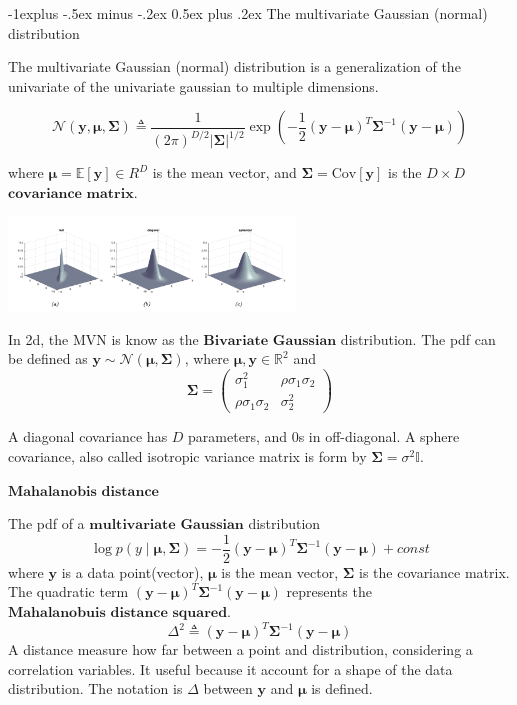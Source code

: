 \documentclass[10pt,landscape]{article}
\makeatletter
\newcommand{\cov}{\textrm{Cov}}
\newcommand{\N}{\mathcal{N}}
\newcommand{\mean}{\mathbb{E}}
\newcommand{\indicator}{\mathbb{I}}
\newcommand{\out}{\textbf{y}}
\newcommand{\R}{\mathbb{R}}
\newcommand{\variance}{\sigma^2}
\newcommand{\Cov}{\mathbf{\Sigma}}
\newcommand{\Mean}{\boldsymbol{\mu}}
\renewcommand{\subsection}{\@startsection{subsection}{2}{0mm}%
                                {-1explus -.5ex minus -.2ex}%
                                {0.5ex plus .2ex}%
                                {\normalfont\normalsize\bfseries}}
\makeatother
\begin{document}
\begin{multicols*}{3}
\subsection{The multivariate Gaussian (normal) distribution}

The multivariate Gaussian (normal) distribution is a generalization of the univariate of the univariate gaussian to multiple dimensions.

\[
    \N(\out,\Mean,\Cov) \triangleq \frac{1}{(2\pi)^{D/2}|\Cov|^{1/2}}\exp\left(-\frac{1}{2}(\out-\Mean)^T\Cov^{-1}(\out-\Mean)\right)
\]

where $\Mean = \mean[\out] \in R^D$ is the mean vector, and $\Cov=\cov[\out]$ is the $D\times D$ $\textbf{covariance matrix}$.

\begin{minipage}{\linewidth}
    \centering
    \includegraphics[width=3in]{figures/MVN.PNG}
\end{minipage}
In 2d, the MVN is know as the $\textbf{Bivariate Gaussian}$ distribution. The pdf can be defined as $\out\sim\N(\Mean,\Cov)$, where $\Mean,\out\in\R^2$ and 
\[
    \Cov=
    \begin{pmatrix}
        \sigma_1^2  & \rho\sigma_1\sigma_2  \\
        \rho\sigma_1\sigma_2 & \sigma_2^2
    \end{pmatrix}
\]

A diagonal covariance has $D$ parameters, and 0s in off-diagonal. A sphere covariance, also called isotropic variance matrix is form by $\Cov=\variance\indicator$.

$\textbf{Mahalanobis distance}$

The pdf of a $\textbf{multivariate Gaussian}$ distribution
\[
    \log p(y\mid\Mean,\Cov)=-\frac{1}{2}(\out-\Mean)^T\Cov^{-1}(\out-\Mean) + const
\]
where $\out$ is a data point(vector), $\Mean$ is the mean vector, $\Cov$ is the covariance matrix. The quadratic term $(\out-\Mean)^T\Cov^{-1}(\out-\Mean)$ represents the $\textbf{Mahalanobuis distance squared}$.
\[
    \Delta^2 \triangleq (\out-\Mean)^T\Cov^{-1}(\out-\Mean)
\]
A distance measure how far between a point and distribution, considering a correlation variables. It useful because it account for a shape of the data distribution. The notation is $\Delta$ between $\out$ and $\Mean$ is defined.


\end{multicols*}
\end{document}
